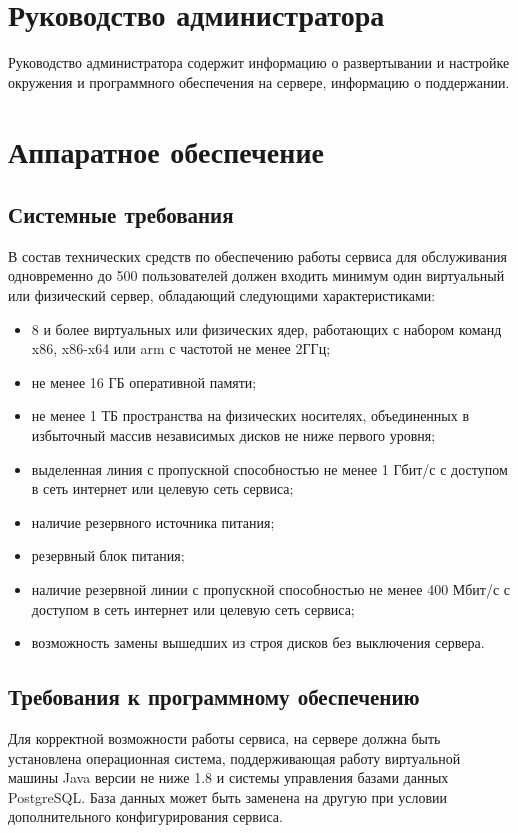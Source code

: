 \section{Руководство администратора}

Руководство администратора содержит информацию о развертывании и настройке окружения и программного обеспечения на сервере, информацию о поддержании.


\section{Аппаратное обеспечение}
\subsection{Системные требования}
В состав технических средств по обеспечению работы сервиса для обслуживания одновременно до 500 пользователей должен входить минимум один виртуальный или физический сервер, обладающий следующими характеристиками:

\begin{itemize}
  \item 8 и более виртуальных или физических ядер, работающих с набором команд x86, x86-x64 или arm с частотой не менее 2ГГц;
  \item не менее 16 ГБ оперативной памяти;
  \item не менее 1 ТБ пространства на физических носителях, объединенных в избыточный массив независимых дисков не ниже первого уровня;
  \item выделенная линия с пропускной способностью не менее 1 Гбит/с с доступом в сеть интернет или целевую сеть сервиса;
  \item наличие резервного источника питания;
  \item резервный блок питания;
  \item наличие резервной линии с пропускной способностью не менее 400 Мбит/с с доступом в сеть интернет или целевую сеть сервиса;
  \item возможность замены вышедших из строя дисков без выключения сервера.
\end{itemize}

\subsection{Требования к программному обеспечению}
Для корректной возможности работы сервиса, на сервере должна быть установлена операционная система, поддерживающая работу виртуальной машины Java версии не ниже 1.8 и системы управления базами данных PostgreSQL. База данных может быть заменена на другую при условии дополнительного конфигурирования сервиса. 

